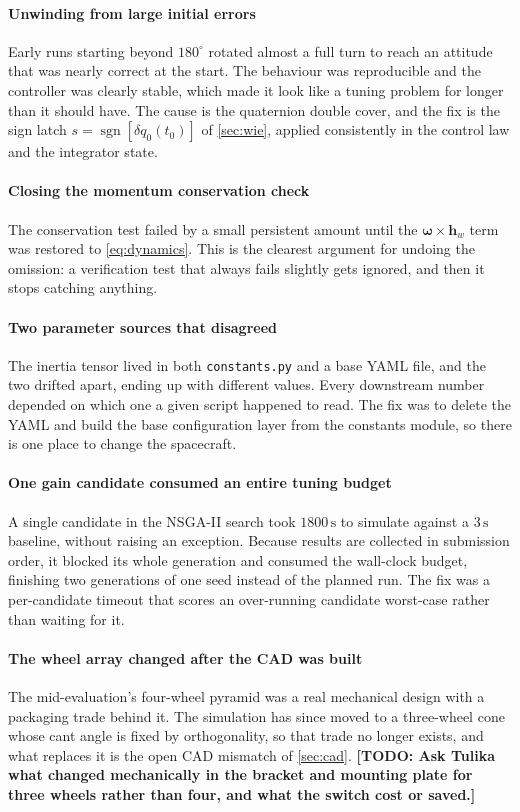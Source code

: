 \documentclass[conference,10pt,a4paper]{IEEEtran}
\newcommand{\TODO}[1]{\textbf{[TODO: #1]}}
\newcommand{\TODO}[1]{}
\newcommand{\vect}[1]{\bm{#1}}
\newcommand{\unit}[1]{\ensuremath{\,\mathrm{#1}}}
\DeclareMathOperator{\sgn}{sgn}
\begin{document}
\paragraph{Unwinding from large initial errors}
Early runs starting beyond $180^\circ$ rotated almost a full turn to reach an
attitude that was nearly correct at the start. The behaviour was reproducible
and the controller was clearly stable, which made it look like a tuning problem
for longer than it should have. The cause is the quaternion double cover, and
the fix is the sign latch $s=\sgn[\delta q_0(t_0)]$ of \cref{sec:wie}, applied
consistently in the control law and the integrator state.

\paragraph{Closing the momentum conservation check}
The conservation test failed by a small persistent amount until the
$\vect{\omega}\times\vect{h}_w$ term was restored to \cref{eq:dynamics}. This
is the clearest argument for undoing the omission: a verification test that
always fails slightly gets ignored, and then it stops catching anything.

\paragraph{Two parameter sources that disagreed}
The inertia tensor lived in both \texttt{constants.py} and a base YAML file,
and the two drifted apart, ending up with different values. Every downstream
number depended on which one a given script happened to read. The fix was to
delete the YAML and build the base configuration layer from the constants
module, so there is one place to change the spacecraft.

\paragraph{One gain candidate consumed an entire tuning budget}
A single candidate in the NSGA-II search took $1800\unit{s}$ to simulate
against a $3\unit{s}$ baseline, without raising an exception. Because results
are collected in submission order, it blocked its whole generation and consumed
the wall-clock budget, finishing two generations of one seed instead of the
planned run. The fix was a per-candidate timeout that scores an over-running
candidate worst-case rather than waiting for it.

\paragraph{The wheel array changed after the CAD was built}
The mid-evaluation's four-wheel pyramid was a real mechanical design with a
packaging trade behind it. The simulation has since moved to a three-wheel cone
whose cant angle is fixed by orthogonality, so that trade no longer exists, and
what replaces it is the open CAD mismatch of \cref{sec:cad}. \TODO{Ask Tulika
what changed mechanically in the bracket and mounting plate for three wheels
rather than four, and what the switch cost or saved.}
\end{document}
